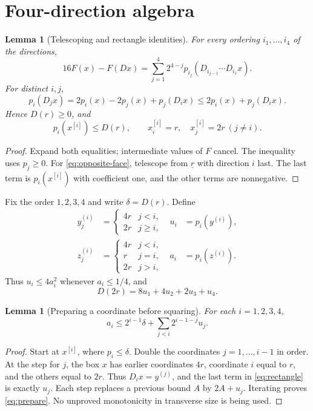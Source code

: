 \documentclass[11pt]{article}
\newtheorem{lemma}[theorem]{Lemma}
\theoremstyle{definition}
\theoremstyle{remark}
\begin{document}
\section{Four-direction algebra}
\begin{lemma}[Telescoping and rectangle identities]\label{lem:algebra}
For every ordering $i_1,\ldots,i_4$ of the directions,
\begin{equation}
 16F(x)-F(Dx)=\sum_{j=1}^4 2^{4-j}
 p_{i_j}(D_{i_{j-1}}\cdots D_{i_1}x).\label{eq:telescope}
\end{equation}
For distinct $i,j$,
\begin{equation}
 p_i(D_jx)=2p_i(x)-2p_j(x)+p_j(D_ix)
 \le2p_i(x)+p_j(D_ix).\label{eq:rectangle}
\end{equation}
Hence $D(r)\ge0$, and
\begin{equation}
 p_i(x^{[i]})\le D(r),\qquad
 x^{[i]}_i=r,\quad x^{[i]}_j=2r\ (j\ne i).\label{eq:opposite-face}
\end{equation}
\end{lemma}
\begin{proof}
Expand both equalities; intermediate values of $F$ cancel. The inequality
uses $p_j\ge0$. For \eqref{eq:opposite-face}, telescope from
$\underline r$ with direction $i$ last. The last term is
$p_i(x^{[i]})$ with coefficient one, and the other terms are nonnegative.
\end{proof}

Fix the order $1,2,3,4$ and write $\delta=D(r)$. Define
\begin{align*}
 y^{(i)}_j&=\begin{cases}4r&j<i,\\2r&j\ge i,\end{cases}
 &u_i&=p_i(y^{(i)}),\\
 z^{(i)}_j&=\begin{cases}4r&j<i,\\r&j=i,\\2r&j>i,\end{cases}
 &a_i&=p_i(z^{(i)}).
\end{align*}
Thus $u_i\le4a_i^2$ whenever $a_i\le1/4$, and
\begin{equation}
 D(2r)=8u_1+4u_2+2u_3+u_4.\label{eq:new-defect}
\end{equation}

\begin{lemma}[Preparing a coordinate before squaring]\label{lem:prepare}
For each $i=1,2,3,4$,
\begin{equation}
 a_i\le 2^{i-1}\delta+\sum_{j<i}2^{i-1-j}u_j.\label{eq:prepare}
\end{equation}
\end{lemma}
\begin{proof}
Start at $x^{[i]}$, where $p_i\le\delta$. Double the coordinates
$j=1,\ldots,i-1$ in order. At the step for $j$, the box $x$ has earlier
coordinates $4r$, coordinate $i$ equal to $r$, and the others equal to
$2r$. Thus $D_i x=y^{(j)}$, and the last term in
\eqref{eq:rectangle} is exactly $u_j$. Each step replaces a previous
bound $A$ by $2A+u_j$. Iterating proves \eqref{eq:prepare}.
No unproved monotonicity in transverse size is being used.
\end{proof}
\end{document}
